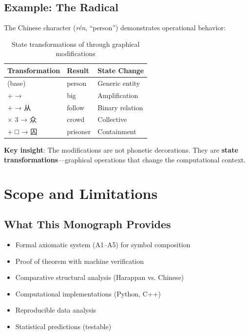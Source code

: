 \subsection{Example: The \ren{} Radical}

The Chinese character \ren{} (\textit{rén}, ``person'') demonstrates operational behavior:

\begin{table}[h]
\centering
\begin{tabular}{lll}
\toprule
\textbf{Transformation} & \textbf{Result} & \textbf{State Change} \\
\midrule
\ren{} (base) & person & Generic entity \\
\ren{} + \yi{} → \da{} & big & Amplification \\
\ren{} + \ren{} → 从 & follow & Binary relation \\
\ren{} × 3 → 众 & crowd & Collective \\
\ren{} + □ → 囚 & prisoner & Containment \\
\bottomrule
\end{tabular}
\caption{State transformations of \ren{} through graphical modifications}
\end{table}

\textbf{Key insight}: The modifications are not phonetic decorations. They are \textbf{state transformations}—graphical operations that change the computational context.

\section{Scope and Limitations}

\subsection{What This Monograph Provides}

\begin{itemize}
    \item Formal axiomatic system (A1--A5) for symbol composition
    \item Proof of \TCOP{} theorem with machine verification
    \item Comparative structural analysis (Harappan vs. Chinese)
    \item Computational implementations (Python, C++)
    \item Reproducible data analysis
    \item Statistical predictions (testable)
\end{itemize}

